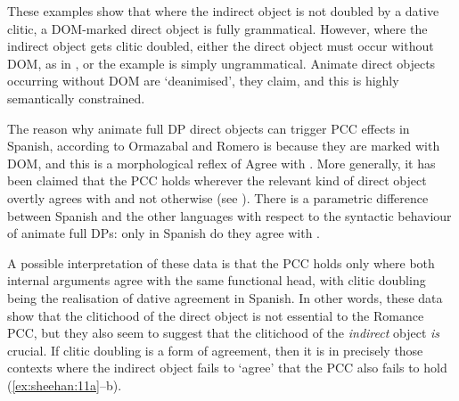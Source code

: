 \documentclass[output=paper,colorlinks,citecolor=brown,nonflat]{langsci/langscibook}
\begin{document}
These examples show that where the indirect object is not doubled by a dative clitic, a DOM-marked direct object is fully grammatical. However, where the indirect object gets clitic doubled, either the direct object must occur without DOM, as in , or the example is simply ungrammatical. Animate direct objects occurring without DOM are ‘deanimised’, they claim, and this is highly semantically constrained.

The reason why animate full DP direct objects can trigger PCC effects in Spanish, according to Ormazabal and Romero is because they are marked with DOM, and this is a morphological reflex of Agree with \liv . More generally, it has been claimed that the PCC holds wherever the relevant kind of direct object overtly agrees with \liv and not otherwise (see \citealt{Preminger2019}). There is a parametric difference between Spanish and the other languages with respect to the syntactic behaviour of animate full DPs: only in Spanish do they agree with \liv .

A possible interpretation of these data is that the PCC holds only where both internal arguments agree with the same functional head, with clitic doubling being the realisation of dative agreement in Spanish. In other words, these data show that the clitichood of the direct object is not essential to the Romance PCC, but they also seem to suggest that the clitichood of the \textit{indirect} object \textit{is} crucial. If clitic doubling is a form of agreement, then it is in precisely those contexts where the indirect object fails to ‘agree’ that the PCC also fails to hold (\ref{ex:sheehan:11a}--b).
\end{document}

